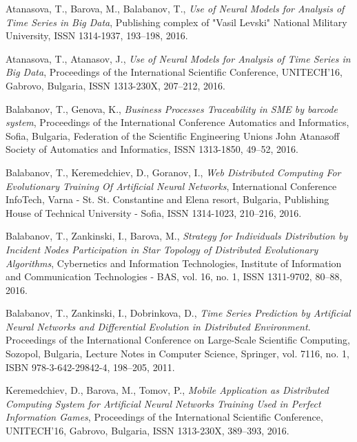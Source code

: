 \documentclass{llncs}
\begin{document}
\begin{thebibliography}{99}

 Atanasova, T., Barova, M., Balabanov, T., \textit{Use of Neural Models for Analysis of Time Series in Big Data}, Publishing complex of "Vasil Levski" National Military University, ISSN 1314-1937, 193--198, 2016.

 Atanasova, T., Atanasov, J., \textit{Use of Neural Models for Analysis of Time Series in Big Data}, Proceedings of the International Scientific Conference, UNITECH’16, Gabrovo, Bulgaria, ISSN 1313-230X,  207--212, 2016.

 Balabanov, T., Genova, K., \textit{Business Processes Traceability in SME by barcode system}, Proceedings of the International Conference Automatics and Informatics, Sofia, Bulgaria, Federation of the Scientific Engineering Unions John Atanasoff Society of Automatics and Informatics, ISSN 1313-1850, 49--52, 2016.

 Balabanov, T., Keremedchiev, D., Goranov, I., \textit{Web Distributed Computing For Evolutionary Training Of Artificial Neural Networks}, International Conference InfoTech, Varna - St. St. Constantine and Elena resort, Bulgaria, Publishing House of Technical University - Sofia, ISSN 1314-1023, 210--216, 2016.

 Balabanov, T., Zankinski, I., Barova, M., \textit{Strategy for Individuals Distribution by Incident Nodes Participation in Star Topology of Distributed Evolutionary Algorithms}, Cybernetics and Information Technologies, Institute of Information and Communication Technologies - BAS, vol. 16, no. 1, ISSN 1311-9702, 80--88, 2016.

 Balabanov, T., Zankinski, I., Dobrinkova, D., \textit{Time Series Prediction by Artificial Neural Networks and Differential Evolution in Distributed Environment}. Proceedings of the International Conference on Large-Scale Scientific Computing, Sozopol, Bulgaria, Lecture Notes in Computer Science, Springer, vol. 7116, no. 1, ISBN 978-3-642-29842-4, 198–205, 2011. 

 Keremedchiev, D., Barova, M., Tomov, P., \textit{Mobile Application as Distributed Computing System for Artificial Neural Networks Training Used in Perfect Information Games}, Proceedings of the International Scientific Conference, UNITECH’16, Gabrovo, Bulgaria, ISSN 1313-230X, 389--393, 2016.


\end{thebibliography}
\end{document}
